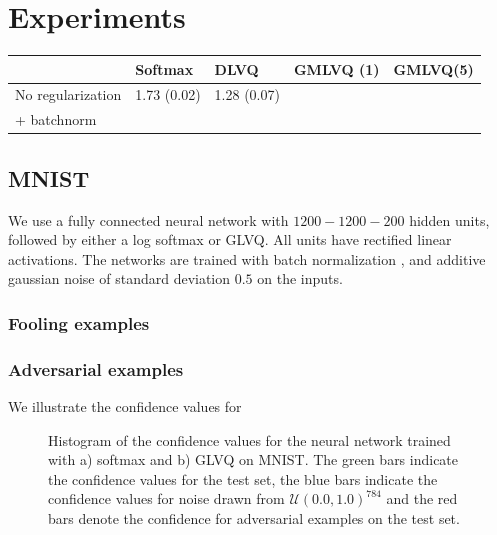 \documentclass{esannV2}
\begin{document}
\section{Experiments}
\begin{table}
 \begin{tabular}{l|llll}
  & Softmax & DLVQ & GMLVQ (1) & GMLVQ(5)\\
 \hline
 No regularization & 1.73 (0.02) & 1.28 (0.07) &  &\\
 + batchnorm &   
 \end{tabular}
\end{table}

\subsection{MNIST}
We use a fully connected neural network with $1200-1200-200$ hidden units, followed by either a log softmax or GLVQ. All units have rectified linear activations. The networks are trained with batch normalization \cite{DBLP:journals/corr/IoffeS15}, and additive gaussian noise of standard deviation $0.5$ on the inputs. 

\subsubsection{Fooling examples}

\subsubsection{Adversarial examples}
We illustrate the confidence values for 

\begin{figure}[t]
\caption{Histogram of the confidence values for the neural network trained with a) softmax and b) GLVQ on MNIST. The green bars indicate the confidence values for the test set, the blue bars indicate the confidence values for noise drawn from $\mathcal{U}(0.0, 1.0)^{784}$ and the red bars denote the confidence for adversarial examples on the test set.}
\end{figure}
\end{document}
